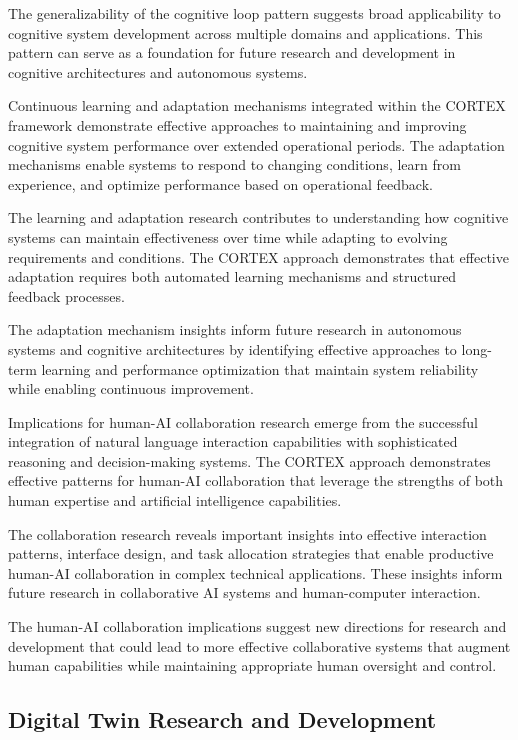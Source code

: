 The generalizability of the cognitive loop pattern suggests broad applicability to cognitive system development across multiple domains and applications. This pattern can serve as a foundation for future research and development in cognitive architectures and autonomous systems.

Continuous learning and adaptation mechanisms integrated within the CORTEX framework demonstrate effective approaches to maintaining and improving cognitive system performance over extended operational periods. The adaptation mechanisms enable systems to respond to changing conditions, learn from experience, and optimize performance based on operational feedback.

The learning and adaptation research contributes to understanding how cognitive systems can maintain effectiveness over time while adapting to evolving requirements and conditions. The CORTEX approach demonstrates that effective adaptation requires both automated learning mechanisms and structured feedback processes.

The adaptation mechanism insights inform future research in autonomous systems and cognitive architectures by identifying effective approaches to long-term learning and performance optimization that maintain system reliability while enabling continuous improvement.

Implications for human-AI collaboration research emerge from the successful integration of natural language interaction capabilities with sophisticated reasoning and decision-making systems. The CORTEX approach demonstrates effective patterns for human-AI collaboration that leverage the strengths of both human expertise and artificial intelligence capabilities.

The collaboration research reveals important insights into effective interaction patterns, interface design, and task allocation strategies that enable productive human-AI collaboration in complex technical applications. These insights inform future research in collaborative AI systems and human-computer interaction.

The human-AI collaboration implications suggest new directions for research and development that could lead to more effective collaborative systems that augment human capabilities while maintaining appropriate human oversight and control.

\subsection{Digital Twin Research and Development}

